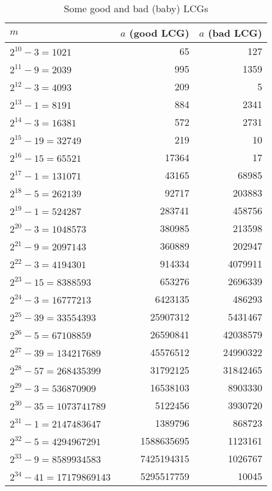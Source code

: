 \begin {table}
\begin {center}
\caption {Some good and bad (baby) LCGs}
\label {tab:lcg1t}
\smallskip
\begin {tabular}{|lrr|}
\hline
\qquad $m$             & $a$ (good LCG)  & $a$ (bad LCG)  \\
\hline
 $2^{10}-3  = 1021$    &  65             & 127  \\
 $2^{11}-9  = 2039$    & 995             & 1359 \\
 $2^{12}-3 = 4093$    & 209             & 5  \\
 $2^{13}-1 = 8191$    & 884             & 2341 \\
 $2^{14}-3 = 16381$   & 572             & 2731 \\
 $2^{15}-19 = 32749$  & 219             & 10 \\
 $2^{16}-15 = 65521$  & 17364           & 17 \\
 $2^{17}-1 = 131071$  & 43165           & 68985 \\
 $2^{18}-5 = 262139$  & 92717           & 203883 \\
 $2^{19}-1 = 524287$  & 283741          & 458756 \\
 $2^{20}-3 = 1048573$ & 380985          & 213598 \\
 $2^{21}-9 = 2097143$  & 360889          & 202947 \\
 $2^{22}-3 = 4194301$  & 914334          & 4079911 \\
 $2^{23}-15 = 8388593$  & 653276         & 2696339 \\
 $2^{24}-3 = 16777213$  & 6423135        & 486293 \\
 $2^{25}-39 = 33554393$  & 25907312      & 5431467 \\
 $2^{26}-5 = 67108859$  & 26590841       & 42038579 \\
 $2^{27}-39 = 134217689$  & 45576512     & 24990322 \\
 $2^{28}-57 = 268435399$  & 31792125     & 31842465 \\
 $2^{29}-3 = 536870909$   & 16538103     & 8903330 \\
 $2^{30}-35 = 1073741789$  & 5122456     & 3930720 \\
 $2^{31}-1 = 2147483647$  &  1389796     & 868723 \\
 $2^{32} -5 = 4294967291$ & 1588635695   & 1123161 \\
 $2^{33}-9 = 8589934583 $ & 7425194315   & 1026767 \\
 $2^{34}-41 = 17179869143$ & 5295517759  & 10045 \\

\end{tabular}
\end{center}
\end{table}
